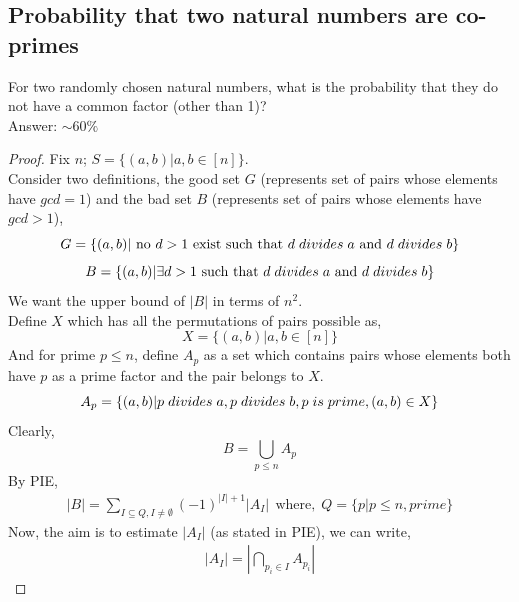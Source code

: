 \subsection{Probability that two natural numbers are co-primes} \label{subsec:co-primes application}
For two randomly chosen natural numbers, what is the probability that they do not have a common factor (other than 1)?\\
Answer: $\sim60\% $
\begin{proof}
Fix $n$; $S = \{(a,b) | a,b \in [n]\}$.\\
Consider two definitions, the good set $G$ (represents set of pairs whose elements have $gcd = 1$) and the bad set $B$ (represents set of pairs whose elements have $gcd > 1$),
\[
G = \{(a,b)| \text{ no } d > 1 \text{ exist such that }d  \hspace{0.1cm}divides \hspace{0.1cm} a \text{ and } d  \hspace{0.1cm}divides \hspace{0.1cm} b\}
\]
\[
B = \{(a,b)| \exists d > 1 \text{ such that }d \hspace{0.1cm}divides \hspace{0.1cm} a \text{ and } d \hspace{0.1cm}divides \hspace{0.1cm} b\}
\]
We want the upper bound of $|B|$ in terms of $n^2$.\\
Define $X$ which has all the permutations of pairs possible as, $$X = \{(a,b)|a,b \in [n]\}$$
And for prime $p \le n$, define $A_p$ as a set which contains pairs whose elements both have $p$ as a prime factor and the pair belongs to $X$. $$A_p = \{(a,b)|p \hspace{0.1cm}divides \hspace{0.1cm}a,p \hspace{0.1cm}divides \hspace{0.1cm}b, p \hspace{0.1cm}is\hspace{0.1cm}prime ,(a,b)\in X\}$$
Clearly, $$B = \bigcup_{p \le n} A_p$$
By PIE, 
\begin{align}
|B| = \sum_{I \subseteq Q, I \neq \emptyset} (-1)^{|I|+1} |A_I| ~~\text{where,} ~~Q = \{p|p \le n, prime\}\label{eq:PIE_usage_application_3}
\end{align}
Now, the aim is to estimate $|A_I|$ (as stated in PIE), we can write,
\begin{align}
|A_I| =|\bigcap_{p_i \in I} A_{p_i}|\label{eq:size_of_A_I_mobius}
\end{align}

\end{proof}
